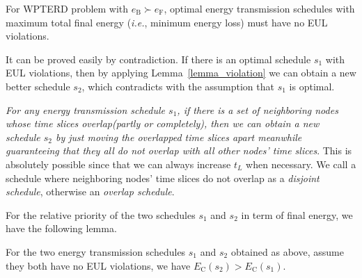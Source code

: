 \documentclass[journal,10pt]{IEEEtran}
\begin{document}
\begin{theorem}
\label{theorem_no_violation}
For WPTERD problem with $e_\text{B}{\succ}e_\text{F}$, optimal energy transmission schedules with maximum total final energy (\textit{i.e.}, minimum energy loss) must have no EUL violations.
\end{theorem}

\begin{IEEEproof}
It can be proved easily by contradiction. If there is an optimal schedule $s_1$ with EUL violations, then by applying Lemma~\ref{lemma_violation} we can obtain a new better schedule $s_2$, which contradicts with the assumption that $s_1$ is optimal.
\end{IEEEproof}

\textit{For any energy transmission schedule $s_1$, if there is a set of neighboring nodes whose time slices overlap(partly or completely), then we can obtain a new schedule $s_{2}$ by just moving the overlapped time slices apart meanwhile guaranteeing that they all do not overlap with all other nodes' time slices}. This is absolutely possible since that we can always increase $t_L$ when necessary. We call a schedule where neighboring nodes' time slices do not overlap as a \textit{disjoint schedule}, otherwise an \textit{overlap schedule}.

For the relative priority of the two schedules $s_1$ and $s_2$ in term of final energy, we have the following lemma.

\begin{lemma}
\label{lemma_interval_disjoint}
For the two energy transmission schedules $s_1$ and $s_2$ obtained as above, assume they both have no EUL violations, we have $E_\text{C}(s_2){>}E_\text{C}(s_1)$.
\end{lemma}
\end{document}
